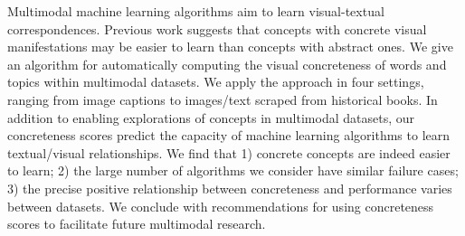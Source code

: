 Multimodal machine learning algorithms aim to learn visual-textual correspondences. Previous work suggests that concepts with concrete visual manifestations may be easier to learn than concepts with abstract ones. We give an algorithm for automatically computing the visual concreteness of words and topics within multimodal datasets. We apply the approach in four settings, ranging from image captions to images/text scraped from historical books. In addition to enabling explorations of concepts in multimodal datasets, our concreteness scores predict the capacity of machine learning algorithms to learn textual/visual relationships. We find that 1) concrete concepts are indeed easier to learn; 2) the large number of algorithms we consider have similar failure cases; 3) the precise positive relationship between concreteness and performance varies between datasets. We conclude with recommendations for using concreteness scores to facilitate future multimodal research.

